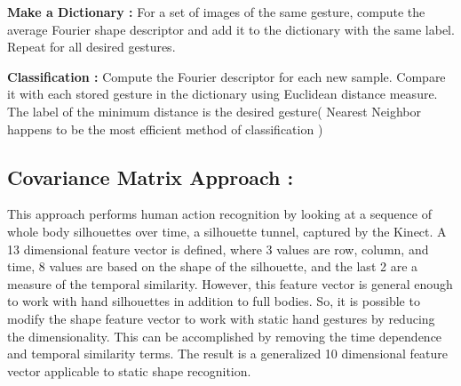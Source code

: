 \textbf{Make a Dictionary : } For a set of images of the same gesture, compute the average Fourier shape descriptor and add it to the dictionary with the same label.  Repeat for all desired gestures.

\textbf{Classification  : }Compute the Fourier descriptor for each new sample.  Compare it with each stored gesture in the dictionary using  Euclidean distance measure.  The label of the minimum distance is the desired gesture( Nearest Neighbor happens to be the most efficient method of classification )

\subsection{Covariance Matrix Approach :}
This approach \cite{21}
performs human action recognition by looking at a sequence of whole body silhouettes
over time, a silhouette tunnel, captured by the Kinect. A 13 dimensional feature vector
is defined, where 3 values are row, column, and time, 8 values are based on the shape of
the silhouette, and the last 2 are a measure of the temporal similarity.
However, this feature vector is general enough to work with hand silhouettes in addition
to full bodies. So, it is possible to modify the shape feature vector to work with static
hand gestures by reducing the dimensionality. This can be accomplished by removing
the time dependence and temporal similarity terms. The result is a generalized 10
dimensional feature vector applicable to static shape recognition.\\

